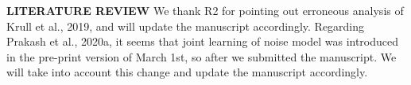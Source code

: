 \documentclass{article}
\begin{document}
\textbf{LITERATURE REVIEW}
We thank R2 for pointing out erroneous analysis of Krull et al., 2019, and will update the manuscript accordingly.
Regarding Prakash et al., 2020a, it seems that joint learning of noise model was introduced in the pre-print version of March 1st, so after we submitted the manuscript. We will take into account this change and update the manuscript accordingly.
\end{document}
